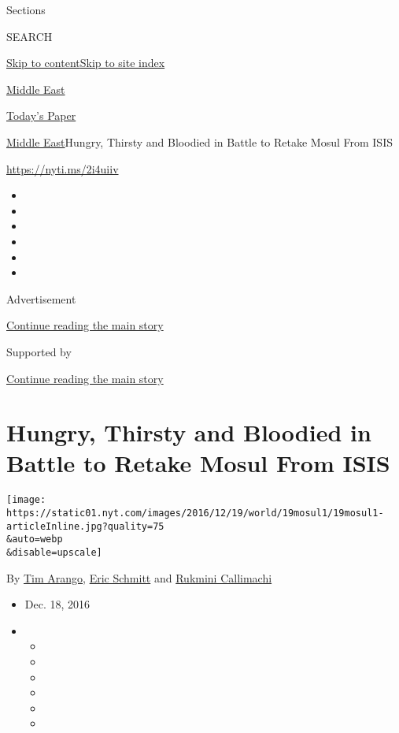 Sections

SEARCH

\protect\hyperlink{site-content}{Skip to
content}\protect\hyperlink{site-index}{Skip to site index}

\href{https://www.nytimes.com/section/world/middleeast}{Middle East}

\href{https://myaccount.nytimes.com/auth/login?response_type=cookie\&client_id=vi}{}

\href{https://www.nytimes.com/section/todayspaper}{Today's Paper}

\href{/section/world/middleeast}{Middle East}\textbar{}Hungry, Thirsty
and Bloodied in Battle to Retake Mosul From ISIS

\url{https://nyti.ms/2i4uiiv}

\begin{itemize}
\item
\item
\item
\item
\item
\item
\end{itemize}

Advertisement

\protect\hyperlink{after-top}{Continue reading the main story}

Supported by

\protect\hyperlink{after-sponsor}{Continue reading the main story}

\hypertarget{hungry-thirsty-and-bloodied-in-battle-to-retake-mosul-from-isis}{%
\section{Hungry, Thirsty and Bloodied in Battle to Retake Mosul From
ISIS}\label{hungry-thirsty-and-bloodied-in-battle-to-retake-mosul-from-isis}}

\texttt{[image: https://static01.nyt.com/images/2016/12/19/world/19mosul1/19mosul1-articleInline.jpg?quality=75\\\&auto=webp\\\&disable=upscale]}

By \href{http://www.nytimes.com/by/tim-arango}{Tim Arango},
\href{http://www.nytimes.com/by/eric-schmitt}{Eric Schmitt} and
\href{http://www.nytimes.com/by/rukmini-callimachi}{Rukmini Callimachi}

\begin{itemize}
\item
  Dec. 18, 2016
\item
  \begin{itemize}
  \item
  \item
  \item
  \item
  \item
  \item
  \end{itemize}
\end{itemize}

